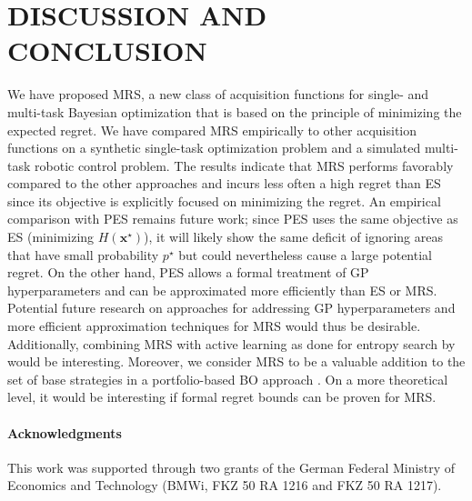 \documentclass[10pt,letterpaper]{article} %
\begin{document}
\section{DISCUSSION AND CONCLUSION}

We have proposed MRS, a new class of acquisition functions for single- and multi-task
Bayesian optimization that is based on the principle of minimizing the expected
regret. We have compared MRS empirically to other acquisition functions on a
synthetic single-task optimization problem and a simulated multi-task robotic
control problem.  The results indicate that MRS performs favorably compared to the
other approaches and incurs less often a high regret than ES since its
objective is explicitly focused on minimizing the regret. An empirical
comparison with PES remains future work; since PES uses the same objective as ES
(minimizing $H(\mathbf{x}^\star)$), it will likely show the same deficit of
ignoring areas that have small probability $p^\star$ but could nevertheless cause a large
potential regret. On the other hand, PES allows a formal treatment
of GP hyperparameters and can be approximated more efficiently than ES or MRS.
Potential future research on approaches for addressing
GP hyperparameters and more efficient approximation techniques for MRS would thus be desirable. Additionally,
combining MRS with active learning as done for entropy search by
\citet{metzen_active_2015} would be interesting. Moreover, we consider MRS to
be a valuable addition to the set of base strategies in a portfolio-based BO
approach \cite{shahriari_entropy_2014}. On a more theoretical level, it would be interesting if formal regret bounds can be proven for MRS.


\paragraph{Acknowledgments}
This work was supported through two grants of the German Federal Ministry of Economics and Technology (BMWi, FKZ 50 RA 1216 and FKZ 50 RA 1217).



\end{document}
